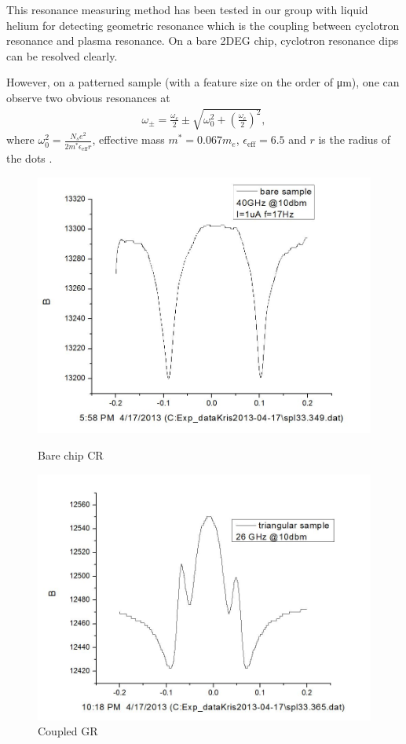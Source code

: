 \documentclass[12pt]{ruthesis}
\begin{document}
This resonance measuring method has been tested in our group with liquid helium for detecting geometric resonance which is the coupling between cyclotron resonance and plasma resonance. 
On a bare 2DEG chip, cyclotron resonance dips can be resolved clearly.


However, on a patterned sample (with a feature size on the order of \si{\micro\meter}), one can observe two obvious resonances at
\begin{align}
\omega_{\pm}=\frac{\omega_{c}}{2} \pm \sqrt{ \omega_{0}^{2}+ \left(\frac{ \omega_{c} }{2}\right)^{2}},
\end{align}
where $\displaystyle \omega_{0}^{2}=\frac{N_{s}e^{2}}{2m^{\ast}\epsilon_{\mathrm{eff}}r}$, effective mass $m^{*}=0.067m_{e}$, $\epsilon_{\mathrm{eff}}=6.5$ and $r$ is the radius of the dots \cite{PhysRevB.28.4875}.
\begin{figure}[!htb]\centering
   \begin{minipage}{0.49\textwidth}
     \includegraphics[width=\linewidth]{figures/bare_cr.JPG}
     \caption{Bare chip CR}\label{bare_cr}
   \end{minipage}
   \begin {minipage}{0.49\textwidth}
     \includegraphics[width=\linewidth]{figures/coupled_cr.JPG}
     \caption{Coupled GR}\label{coupled_cr}
   \end{minipage}
\end{figure}
\end{document}
